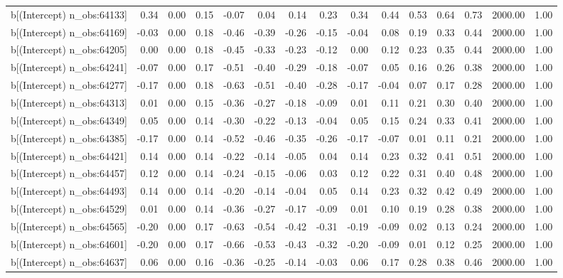 \begin{table}[ht]
\begin{tabular}{rrrrrrrrrrrrrrr}
  b[(Intercept) n\_obs:64133] & 0.34 & 0.00 & 0.15 & -0.07 & 0.04 & 0.14 & 0.23 & 0.34 & 0.44 & 0.53 & 0.64 & 0.73 & 2000.00 & 1.00 \\ 
  b[(Intercept) n\_obs:64169] & -0.03 & 0.00 & 0.18 & -0.46 & -0.39 & -0.26 & -0.15 & -0.04 & 0.08 & 0.19 & 0.33 & 0.44 & 2000.00 & 1.00 \\ 
  b[(Intercept) n\_obs:64205] & 0.00 & 0.00 & 0.18 & -0.45 & -0.33 & -0.23 & -0.12 & 0.00 & 0.12 & 0.23 & 0.35 & 0.44 & 2000.00 & 1.00 \\ 
  b[(Intercept) n\_obs:64241] & -0.07 & 0.00 & 0.17 & -0.51 & -0.40 & -0.29 & -0.18 & -0.07 & 0.05 & 0.16 & 0.26 & 0.38 & 2000.00 & 1.00 \\ 
  b[(Intercept) n\_obs:64277] & -0.17 & 0.00 & 0.18 & -0.63 & -0.51 & -0.40 & -0.28 & -0.17 & -0.04 & 0.07 & 0.17 & 0.28 & 2000.00 & 1.00 \\ 
  b[(Intercept) n\_obs:64313] & 0.01 & 0.00 & 0.15 & -0.36 & -0.27 & -0.18 & -0.09 & 0.01 & 0.11 & 0.21 & 0.30 & 0.40 & 2000.00 & 1.00 \\ 
  b[(Intercept) n\_obs:64349] & 0.05 & 0.00 & 0.14 & -0.30 & -0.22 & -0.13 & -0.04 & 0.05 & 0.15 & 0.24 & 0.33 & 0.41 & 2000.00 & 1.00 \\ 
  b[(Intercept) n\_obs:64385] & -0.17 & 0.00 & 0.14 & -0.52 & -0.46 & -0.35 & -0.26 & -0.17 & -0.07 & 0.01 & 0.11 & 0.21 & 2000.00 & 1.00 \\ 
  b[(Intercept) n\_obs:64421] & 0.14 & 0.00 & 0.14 & -0.22 & -0.14 & -0.05 & 0.04 & 0.14 & 0.23 & 0.32 & 0.41 & 0.51 & 2000.00 & 1.00 \\ 
  b[(Intercept) n\_obs:64457] & 0.12 & 0.00 & 0.14 & -0.24 & -0.15 & -0.06 & 0.03 & 0.12 & 0.22 & 0.31 & 0.40 & 0.48 & 2000.00 & 1.00 \\ 
  b[(Intercept) n\_obs:64493] & 0.14 & 0.00 & 0.14 & -0.20 & -0.14 & -0.04 & 0.05 & 0.14 & 0.23 & 0.32 & 0.42 & 0.49 & 2000.00 & 1.00 \\ 
  b[(Intercept) n\_obs:64529] & 0.01 & 0.00 & 0.14 & -0.36 & -0.27 & -0.17 & -0.09 & 0.01 & 0.10 & 0.19 & 0.28 & 0.38 & 2000.00 & 1.00 \\ 
  b[(Intercept) n\_obs:64565] & -0.20 & 0.00 & 0.17 & -0.63 & -0.54 & -0.42 & -0.31 & -0.19 & -0.09 & 0.02 & 0.13 & 0.24 & 2000.00 & 1.00 \\ 
  b[(Intercept) n\_obs:64601] & -0.20 & 0.00 & 0.17 & -0.66 & -0.53 & -0.43 & -0.32 & -0.20 & -0.09 & 0.01 & 0.12 & 0.25 & 2000.00 & 1.00 \\ 
  b[(Intercept) n\_obs:64637] & 0.06 & 0.00 & 0.16 & -0.36 & -0.25 & -0.14 & -0.03 & 0.06 & 0.17 & 0.28 & 0.38 & 0.46 & 2000.00 & 1.00 \\ 

\end{tabular}
\end{table}
